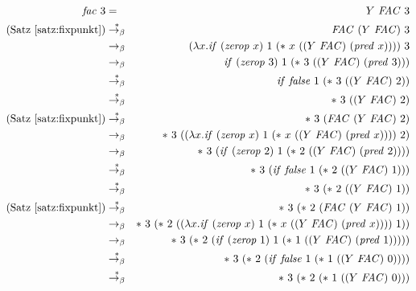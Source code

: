 \begin{figure}[!tb]
  \begin{center}
    \scriptsize
    \begin{eqnarray*}
    \mathit{fac}~3 &=& Y~\mathit{FAC}~3\\
    \text{(Satz~\ref{satz:fixpunkt})} &\overset{\ast}{\rightarrow_{\beta}}&
    \mathit{FAC}~(Y~\mathit{FAC})~3\\
    &\rightarrow_{\beta}&
    (\lambda x.\mathit{if}~(\mathit{zerop}~x)~1~(\ast~x~((Y~\mathit{FAC})~(\mathit{pred}~x))))~3\\
    &\rightarrow_{\beta}&
    \mathit{if}~(\mathit{zerop}~ 3)~1~(\ast~3~((Y~\mathit{FAC})~(\mathit{pred}~3)))
    \\
    &\overset{\ast}{\rightarrow_{\beta}}&
    \mathit{if}~\mathit{false}~1~(\ast~3~((Y~\mathit{FAC})~2))\\
    &\overset{\ast}{\rightarrow_{\beta}}&
    \ast~3~((Y~\mathit{FAC})~2)\\
    \text{(Satz~\ref{satz:fixpunkt})} &\overset{\ast}{\rightarrow_{\beta}}&
    \ast~3~(\mathit{FAC}~(Y~\mathit{FAC})~2)\\
    &\rightarrow_{\beta}&
    \ast~3~((\lambda
    x.\mathit{if}~(\mathit{zerop}~x)~1~(\ast~x~((Y~\mathit{FAC})~(\mathit{pred}~x))))~2)\\
    &\rightarrow_{\beta}&
    \ast~3~(\mathit{if}~(\mathit{zerop}~ 2)~1~(\ast~2~((Y~\mathit{FAC})~(\mathit{pred}~2))))\\
    &\overset{\ast}{\rightarrow_{\beta}}&
    \ast~3~(\mathit{if}~\mathit{false}~1~(\ast~2~((Y~\mathit{FAC})~1)))\\
    &\overset{\ast}{\rightarrow_{\beta}}&
    \ast~3~(\ast~2~((Y~\mathit{FAC})~1))\\
    \text{(Satz~\ref{satz:fixpunkt})} &\overset{\ast}{\rightarrow_{\beta}}&
    \ast~3~(\ast~2~(\mathit{FAC}~(Y~\mathit{FAC})~1))\\
    &\rightarrow_{\beta}&
    \ast~3~(\ast~2~((\lambda
    x.\mathit{if}~(\mathit{zerop}~x)~1~(\ast~x~((Y~\mathit{FAC})~(\mathit{pred}~x))))~1))\\
%
%
    &\rightarrow_{\beta}&
    \ast~3~(\ast~2~(\mathit{if}~(\mathit{zerop}~1)~1~(\ast~1~((Y~\mathit{FAC})~(\mathit{pred}~1)))))\\
    &\overset{\ast}{\rightarrow_{\beta}}&
    \ast~3~(\ast~2~(\mathit{if}~\mathit{false}~1~(\ast~1~((Y~\mathit{FAC})~0))))\\
    &\overset{\ast}{\rightarrow_{\beta}}&
    \ast~3~(\ast~2~(\ast~1~((Y~\mathit{FAC})~0)))\\

\end{eqnarray*}
\end{center}
\end{figure}
